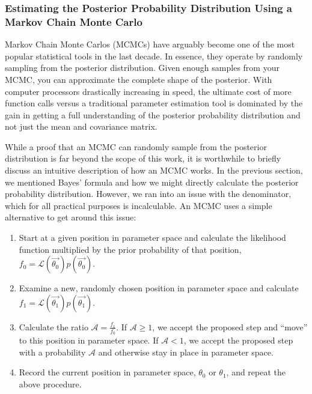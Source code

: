 


\subsubsection{Estimating the Posterior Probability Distribution Using a Markov Chain Monte Carlo}
\label{sec:xe1t_mcmc}


Markov Chain Monte Carlos (MCMCs) have arguably become one of the most popular statistical tools in the last decade.  In essence, they operate by randomly sampling from the posterior distribution.  Given enough samples from your MCMC, you can approximate the complete shape of the posterior.  With computer processors drastically increasing in speed, the ultimate cost of more function calls versus a traditional parameter estimation tool is dominated by the gain in getting a full understanding of the posterior probability distribution and not just the mean and covariance matrix.

While a proof that an MCMC can randomly sample from the posterior distribution is far beyond the scope of this work, it is worthwhile to briefly discuss an intuitive description of how an MCMC works.  In the previous section, we mentioned Bayes' formula and how we might directly calculate the posterior probability distribution.  However, we ran into an issue with the denominator, which for all practical purposes is incalculable.  An MCMC uses a simple alternative to get around this issue:  

\begin{enumerate}
        \item Start at a given position in parameter space and calculate the likelihood function multiplied by the prior probability of that position, $f_0 = \mathcal{L}(\vec{\theta_0}) p(\vec{\theta_0})$.  
        \item Examine a new, randomly chosen position in parameter space and calculate $f_1 = \mathcal{L}(\vec{\theta_1}) p(\vec{\theta_1})$.
        \item Calculate the ratio $\mathcal{A} = \frac{f_1}{f_0}$.  If $\mathcal{A} \geq 1$, we accept the proposed step and ``move'' to this position in parameter space.  If $\mathcal{A} < 1$, we accept the proposed step with a probability $\mathcal{A}$ and otherwise stay in place in parameter space.  
        \item Record the current position in parameter space, $\theta_0$ or $\theta_1$, and repeat the above procedure.
\end{enumerate}

